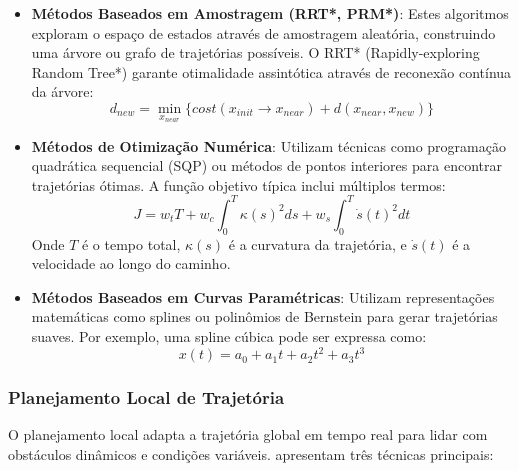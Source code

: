 \begin{itemize}
    \item \textbf{Métodos Baseados em Amostragem (RRT*, PRM*)}: Estes algoritmos exploram o espaço de estados através de amostragem aleatória, construindo uma árvore ou grafo de trajetórias possíveis. O RRT* (Rapidly-exploring Random Tree*) garante otimalidade assintótica através de reconexão contínua da árvore:
          \begin{equation}
              d_{new} = \min_{x_{near}} \{cost(x_{init} \rightarrow x_{near}) + d(x_{near}, x_{new})\}
          \end{equation}

    \item \textbf{Métodos de Otimização Numérica}: Utilizam técnicas como programação quadrática sequencial (SQP) ou métodos de pontos interiores para encontrar trajetórias ótimas. A função objetivo típica inclui múltiplos termos:
          \begin{equation}
              J = w_t T + w_c \int_0^T \kappa(s)^2 ds + w_s \int_0^T \dot{s}(t)^2 dt
          \end{equation}
          Onde $T$ é o tempo total, $\kappa(s)$ é a curvatura da trajetória, e $\dot{s}(t)$ é a velocidade ao longo do caminho.

    \item \textbf{Métodos Baseados em Curvas Paramétricas}: Utilizam representações matemáticas como splines ou polinômios de Bernstein para gerar trajetórias suaves. Por exemplo, uma spline cúbica pode ser expressa como:
          \begin{equation}
              x(t) = a_0 + a_1t + a_2t^2 + a_3t^3
          \end{equation}
\end{itemize}

\subsubsection{Planejamento Local de Trajetória}

O planejamento local adapta a trajetória global em tempo real para lidar com
obstáculos dinâmicos e condições variáveis. \cite{Stachowicz2023FastRLAP}
apresentam três técnicas principais:

